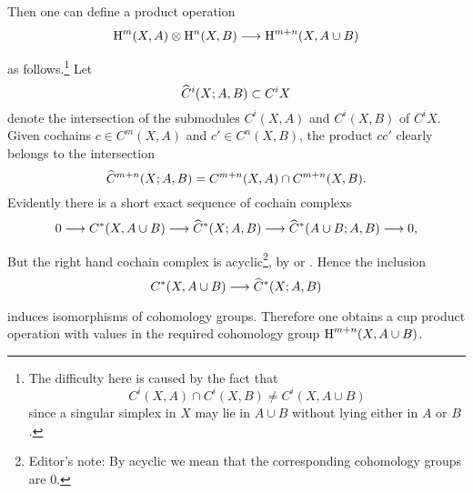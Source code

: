 \documentclass[../main]{subfiles}
\begin{document}
Then one can define a product operation \[\homology^m (X, A) \otimes \homology^n (X, B) \varrightarrow{} \homology^{m+n} (X, A\cup B)\] as follows.\footnote{The difficulty here is caused by the fact that \[C^i (X, A) \cap C^i (X, B) \neq C^i (X, A\cup B)\] since a singular simplex in $X$ may lie in $A\cup B$ without lying either in $A$ or $B$.} Let \[\xhat{C}^i (X; A, B) \subset C^i X\] denote the intersection of the submodules $C^i (X, A)$ and $C^i (X, B)$ of $C^i X$. Given cochains $c \in C^m (X, A)$ and $c' \in C^n (X, B)$, the product $cc'$ clearly belongs to the intersection \[\xhat{C}^{m+n} (X;A, B) = C^{m+n} (X, A) \cap C^{m+n} (X, B).\] Evidently there is a short exact sequence of cochain complexs \[0 \varrightarrow{} C^* (X, A\cup B) \varrightarrow{} \xhat{C}^* (X;A, B) \varrightarrow{} \xhat{C}^* (A \cup B; A, B) \varrightarrow{} 0,\] But the right hand cochain complex is acyclic\footnote{Editor's note: By acyclic we mean that the corresponding cohomology groups are $0$.}, by \cite[p. 197]{eilenbergsteenrod1952} or \cite[p. 252]{spanier1981}. Hence the inclusion \[C^*(X, A\cup B) \varrightarrow{} \xhat{C}^* (X;A, B)\] induces isomorphisms of cohomology groups. Therefore one obtains a cup product operation with values in the required cohomology group $\operatorname{H}^{m+n} (X, A\cup B)$.
\end{document}
